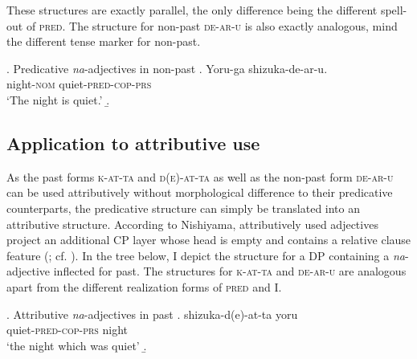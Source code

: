 \documentclass [output=book,colorlinks,citecolor=brown]{langscibook}
\begin{document}
These structures are exactly parallel, the only difference being the different spell-out of \textsc{pred}. The structure for non-past \textsc{de-ar-u} is also exactly analogous, mind the different tense marker for non-past.


\ex. Predicative \textit{na}-adjectives in non-past \null\hfill \citep[189, 194]{nishiyama:1999:adj}
\ag. Yoru-ga shizuka-de-ar-u.\\
night-\textsc{nom} quiet-\textsc{pred-cop-prs}\\
`The night is quiet.'
\b. 

\subsection{Application to attributive use}

As the past forms \textsc{k-at-ta} and \textsc{d(e)-at-ta} as well as the non-past form \textsc{de-ar-u} can be used attributively without morphological difference to their predicative counterparts, the predicative structure can simply be translated into an attributive structure. According to Nishiyama, attributively used adjectives project an additional CP layer whose head is empty and contains a relative clause feature (\citealt[197]{nishiyama:1999:adj}; cf. \citealt{kaplan:1995:the}). In the tree below, I depict the structure for a DP containing a \textit{na}-adjective inflected for past. The structures for \textsc{k-at-ta} and \textsc{de-ar-u} are analogous apart from the different realization forms of \textsc{pred} and I.


\ex. Attributive \textit{na}-adjectives in past \null\hfill \citep[197]{nishiyama:1999:adj}
\ag. shizuka-d(e)-at-ta yoru\\
quiet-\textsc{pred-cop-prs} night\\
`the night which was quiet'
\b. 
\end{document}
